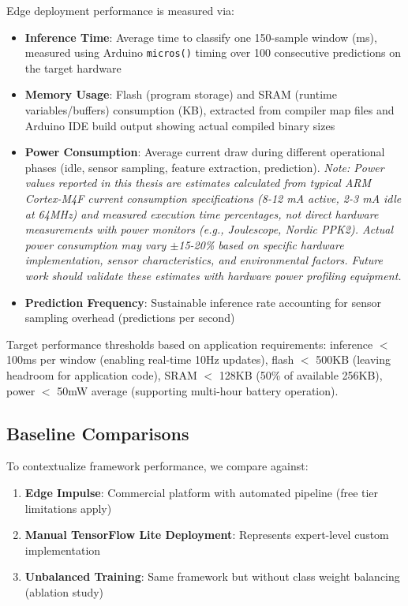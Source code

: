 Edge deployment performance is measured via:
\begin{itemize}
    \item \textbf{Inference Time}: Average time to classify one 150-sample window (ms), measured using Arduino \texttt{micros()} timing over 100 consecutive predictions on the target hardware
    \item \textbf{Memory Usage}: Flash (program storage) and SRAM (runtime variables/buffers) consumption (KB), extracted from compiler map files and Arduino IDE build output showing actual compiled binary sizes
    \item \textbf{Power Consumption}: Average current draw during different operational phases (idle, sensor sampling, feature extraction, prediction). \textit{Note: Power values reported in this thesis are estimates calculated from typical ARM Cortex-M4F current consumption specifications (8-12 mA active, 2-3 mA idle at 64MHz) and measured execution time percentages, not direct hardware measurements with power monitors (e.g., Joulescope, Nordic PPK2). Actual power consumption may vary $\pm$15-20\% based on specific hardware implementation, sensor characteristics, and environmental factors. Future work should validate these estimates with hardware power profiling equipment.}
    \item \textbf{Prediction Frequency}: Sustainable inference rate accounting for sensor sampling overhead (predictions per second)
\end{itemize}
Target performance thresholds based on application requirements: inference $<$ 100ms per window (enabling real-time 10Hz updates), flash $<$ 500KB (leaving headroom for application code), SRAM $<$ 128KB (50\% of available 256KB), power $<$ 50mW average (supporting multi-hour battery operation).

\subsection{Baseline Comparisons}
To contextualize framework performance, we compare against:
\begin{enumerate}
    \item \textbf{Edge Impulse}: Commercial platform with automated pipeline (free tier limitations apply)
    \item \textbf{Manual TensorFlow Lite Deployment}: Represents expert-level custom implementation
    \item \textbf{Unbalanced Training}: Same framework but without class weight balancing (ablation study)
\end{enumerate}

